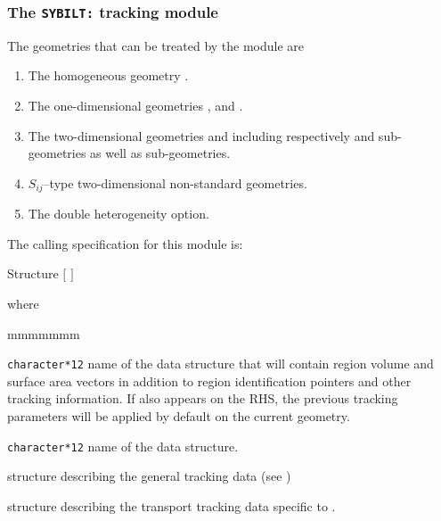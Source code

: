 \subsubsection{The {\tt SYBILT:} tracking module}\label{sect:SYBILData}

The geometries that can be treated by the module  are

\begin{enumerate}

\item The homogeneous geometry .

\item The one-dimensional geometries ,  and
.\cite{ALCOL}

\item The two-dimensional geometries  and  including
respectively  and  sub-geometries as well as 
sub-geometries. 

\item $S_{ij}$--type two-dimensional non-standard geometries.\cite{Apollo}

\item The double heterogeneity option.\cite{BIHET}

\end{enumerate}

The calling specification for this module is:

\begin{DataStructure}{Structure }
\moc{:=}  $[$  $]$
 \moc{::}  
\end{DataStructure}

\noindent  where
\begin{ListeDeDescription}{mmmmmmm}

\item[\dusa{TRKNAM}] {\tt character*12} name of the  data
structure that will contain region volume and surface area vectors in
addition to region identification pointers and other tracking information.
If  also appears on the RHS, the previous tracking 
parameters will be applied by default on the current geometry.

\item[\dusa{GEONAM}] {\tt character*12} name of the  data
structure.

\item[\dstr{desctrack}] structure describing the general tracking data (see
)

\item[\dstr{descsybil}] structure describing the transport tracking data
specific to .

\end{ListeDeDescription}

